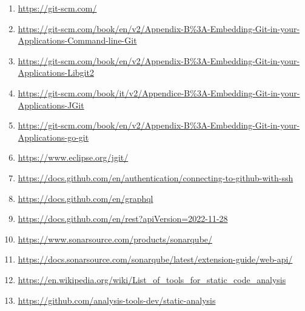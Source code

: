 \begin{enumerate}
    \item \url{https://git-scm.com/}
    \item \url{https://git-scm.com/book/en/v2/Appendix-B%3A-Embedding-Git-in-your-Applications-Command-line-Git}
    \item \url{https://git-scm.com/book/en/v2/Appendix-B%3A-Embedding-Git-in-your-Applications-Libgit2}
    \item \url{https://git-scm.com/book/it/v2/Appendice-B%3A-Embedding-Git-in-your-Applications-JGit}
    \item \url{https://git-scm.com/book/en/v2/Appendix-B%3A-Embedding-Git-in-your-Applications-go-git}
    \item \url{https://www.eclipse.org/jgit/}
    \item \url{https://docs.github.com/en/authentication/connecting-to-github-with-ssh}
    \item \url{https://docs.github.com/en/graphql}
    \item \url{https://docs.github.com/en/rest?apiVersion=2022-11-28}
    \item \url{https://www.sonarsource.com/products/sonarqube/}
    \item \url{https://docs.sonarsource.com/sonarqube/latest/extension-guide/web-api/}
    \item \url{https://en.wikipedia.org/wiki/List_of_tools_for_static_code_analysis}
    \item \url{https://github.com/analysis-tools-dev/static-analysis}
\end{enumerate}